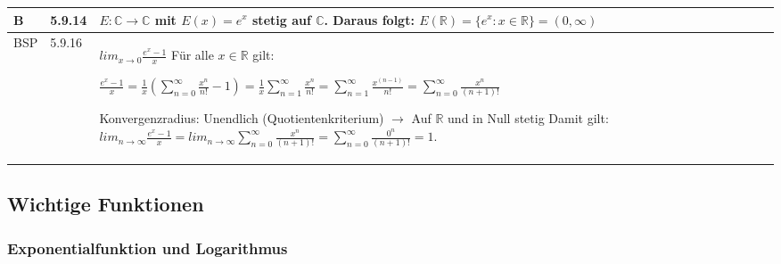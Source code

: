 \begin{longtable}{p{0.75cm} p{1cm} p{16cm}}
        \midrule
        B   & 5.9.14&   $E: \mathbb{C} \rightarrow \mathbb{C}$ mit $E(x) = e^x$ stetig auf $\mathbb{C}$. \hfill \break
                        Daraus folgt: $E(\mathbb{R}) = \{e^x: x \in \mathbb{R}\} = (0, \infty)$ \\ 
        \midrule
        BSP & 5.9.16&   $lim_{x \rightarrow 0} \frac{e^x -1}{x}$ \hfill \break
                        Für alle $x \in \mathbb{R}$ gilt: \hfill \break
                        \centerline{$\frac{e^x-1}{x} = \frac{1}{x} (\sum^{\infty}_{n=0} \frac{x^n}{n!}-1) = \frac{1}{x} \sum^{\infty}_{n=1} \frac{x^n}{n!}
                        = \sum^{\infty}_{n=1} \frac{x^(n-1)}{n!} = \sum^{\infty}_{n=0} \frac{x^n}{(n+1)!}$} 
                        Konvergenzradius: Unendlich (Quotientenkriterium) $\rightarrow$ Auf $\mathbb{R}$ und in Null stetig \hfill \break
                        Damit gilt: $lim_{n \rightarrow \infty} \frac{e^x-1}{x} = lim_{n \rightarrow \infty} \sum^{\infty}_{n=0} \frac{x^n}{(n+1)!} =
                        \sum^{\infty}_{n=0} \frac{0^n}{(n+1)!} = 1$. \\
        \bottomrule
        

    \end{longtable}

\pagebreak

\subsection{Wichtige Funktionen}
\subsubsection{Exponentialfunktion und Logarithmus}

